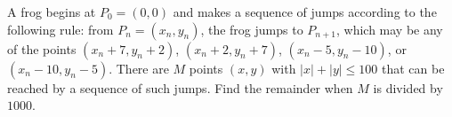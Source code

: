 A frog begins at $P_0 = (0,0)$ and makes a sequence of jumps according to the following rule: from $P_n=(x_n,y_n)$, the frog jumps to $P_{n+1}$, which may be  any of the points $(x_n+7, y_n+2)$, $(x_n+2,y_n+7)$, $(x_n-5, y_n-10)$, or $(x_n-10,y_n-5)$.  There are $M$ points $(x,y)$ with $|x|+|y| \le 100$ that can be reached by a sequence of such jumps.  Find the remainder when $M$ is divided by $1000$.